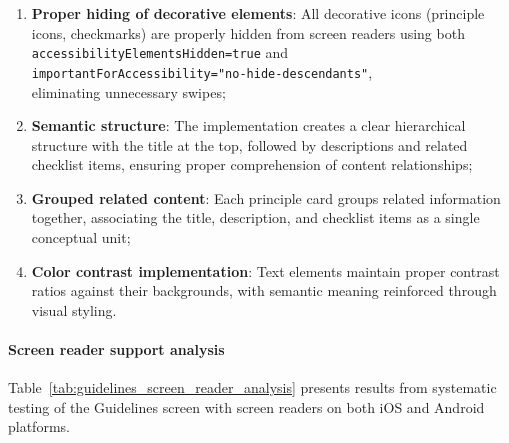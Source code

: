 \begin{enumerate}
    \item \textbf{Proper hiding of decorative elements}: All decorative icons (principle icons, checkmarks) are properly hidden from screen readers using both \\ \texttt{accessibilityElementsHidden=true} and \\ \texttt{importantForAccessibility="no-hide-descendants"}, \\ eliminating unnecessary swipes;
    
    \item \textbf{Semantic structure}: The implementation creates a clear hierarchical structure with the title at the top, followed by descriptions and related checklist items, ensuring proper comprehension of content relationships;
    
    \item \textbf{Grouped related content}: Each principle card groups related information together, associating the title, description, and checklist items as a single conceptual unit;
    
    \item \textbf{Color contrast implementation}: Text elements maintain proper contrast ratios against their backgrounds, with semantic meaning reinforced through visual styling.
\end{enumerate}

\paragraph{Screen reader support analysis}

Table~\ref{tab:guidelines_screen_reader_analysis} presents results from systematic testing of the Guidelines screen with screen readers on both iOS and Android platforms.

